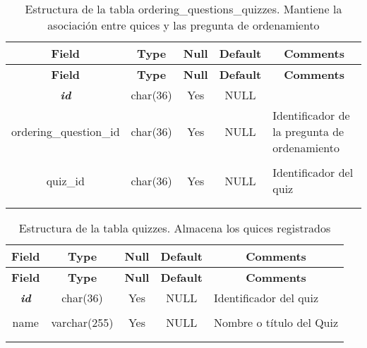 %
%
\begin{longtable}{c c c c l}
	\multicolumn{1}{c}{\textbf{Field}} &
	\multicolumn{1}{c}{\textbf{Type}} &
	\multicolumn{1}{c}{\textbf{Null}} &
	\multicolumn{1}{c}{\textbf{Default}} &
	\multicolumn{1}{c}{\textbf{Comments}} \\ \hline \hline
\endfirsthead
	\multicolumn{1}{c}{\textbf{Field}} &
	\multicolumn{1}{c}{\textbf{Type}} &
	\multicolumn{1}{c}{\textbf{Null}} &
	\multicolumn{1}{c}{\textbf{Default}} &
	\multicolumn{1}{c}{\textbf{Comments}} \\ \hline \hline
\endhead \endfoot
	\textbf{\textit{id}} & char(36) & Yes & NULL \\ \hline 
	ordering\_question\_id & char(36) & Yes & NULL & \parbox[t]{0.35\textwidth}{Identificador de la pregunta de ordenamiento} \\ \\  \hline
	quiz\_id & char(36) & Yes & NULL & \parbox[t]{0.35\textwidth}{Identificador del quiz} \\ \\
\caption[Estructura de la tabla ordering\_questions\_quizzes]{Estructura de la tabla ordering\_questions\_quizzes. Mantiene la asociación entre quices y las pregunta de ordenamiento} \label{tab:quiz_ordering_questions_quizzes-structure} \\
\end{longtable}

%
%
\begin{longtable}{c c c c l}
	\multicolumn{1}{c}{\textbf{Field}} &
	\multicolumn{1}{c}{\textbf{Type}} &
	\multicolumn{1}{c}{\textbf{Null}} &
	\multicolumn{1}{c}{\textbf{Default}} &
	\multicolumn{1}{c}{\textbf{Comments}} \\ \hline \hline
\endfirsthead
	\multicolumn{1}{c}{\textbf{Field}} &
	\multicolumn{1}{c}{\textbf{Type}} &
	\multicolumn{1}{c}{\textbf{Null}} &
	\multicolumn{1}{c}{\textbf{Default}} &
	\multicolumn{1}{c}{\textbf{Comments}} \\ \hline \hline
\endhead \endfoot
	\textbf{\textit{id}} & char(36) & Yes & NULL & \parbox[t]{0.35\textwidth}{Identificador del quiz} \\ \\ \hline
	name & varchar(255) & Yes & NULL & \parbox[t]{0.35\textwidth}{Nombre o título del Quiz} \\ \\
\caption[Estructura de la tabla quizzes]{Estructura de la tabla quizzes. Almacena los quices registrados} \label{tab:quiz_quizzes-structure} \\
\end{longtable}

